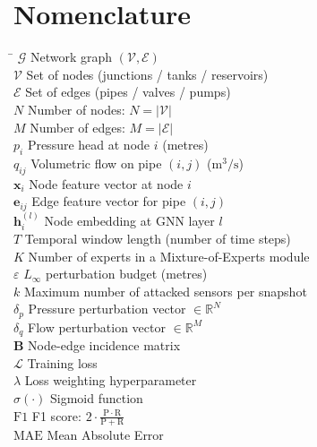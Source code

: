 \chapter*{Nomenclature}

\begin{tabbing}
  \hspace{3cm} \= \kill
  $\mathcal{G}$       \> Network graph $(\mathcal{V}, \mathcal{E})$ \\[0.3em]
  $\mathcal{V}$       \> Set of nodes (junctions / tanks / reservoirs) \\[0.3em]
  $\mathcal{E}$       \> Set of edges (pipes / valves / pumps) \\[0.3em]
  $N$                 \> Number of nodes: $N = |\mathcal{V}|$ \\[0.3em]
  $M$                 \> Number of edges: $M = |\mathcal{E}|$ \\[0.3em]
  $p_i$               \> Pressure head at node $i$ (metres) \\[0.3em]
  $q_{ij}$            \> Volumetric flow on pipe $(i,j)$ ($\mathrm{m}^3/\mathrm{s}$) \\[0.3em]
  $\mathbf{x}_i$      \> Node feature vector at node $i$ \\[0.3em]
  $\mathbf{e}_{ij}$   \> Edge feature vector for pipe $(i,j)$ \\[0.3em]
  $\mathbf{h}_i^{(l)}$\> Node embedding at GNN layer $l$ \\[0.3em]
  $T$                 \> Temporal window length (number of time steps) \\[0.3em]
  $K$                 \> Number of experts in a Mixture-of-Experts module \\[0.3em]
  $\varepsilon$        \> $L_\infty$ perturbation budget (metres) \\[0.3em]
  $k$                 \> Maximum number of attacked sensors per snapshot \\[0.3em]
  $\delta_p$          \> Pressure perturbation vector $\in \mathbb{R}^N$ \\[0.3em]
  $\delta_q$          \> Flow perturbation vector $\in \mathbb{R}^M$ \\[0.3em]
  $\mathbf{B}$        \> Node-edge incidence matrix \\[0.3em]
  $\mathcal{L}$       \> Training loss \\[0.3em]
  $\lambda$           \> Loss weighting hyperparameter \\[0.3em]
  $\sigma(\cdot)$     \> Sigmoid function \\[0.3em]
  $\mathrm{F1}$       \> F1 score: $2 \cdot \frac{\mathrm{P} \cdot \mathrm{R}}{\mathrm{P} + \mathrm{R}}$ \\[0.3em]
  $\mathrm{MAE}$      \> Mean Absolute Error \\[0.3em]
\end{tabbing}
